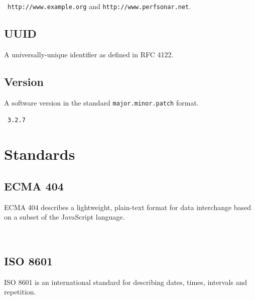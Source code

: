 \documentclass[10pt]{article}
\begin{document}
\example\ {\tt http://www.example.org} and {\tt http://www.perfsonar.net}.



\subsection{UUID}
A universally-unique identifier as defined in RFC 4122.



\subsection{Version}
A software version in the standard {\tt major.minor.patch} format.

\example\ {\tt 3.2.7}




%
%

\section{Standards}\label{standards}

\subsection{ECMA 404}
ECMA 404 describes a lightweight, plain-text format for data
interchange based on a subset of the JavaScript language.

\\


\subsection{ISO 8601}
ISO 8601 is an international standard for describing dates, times,
intervals and repetition.

\\
\end{document}
